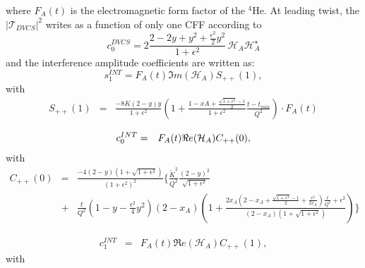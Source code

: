 \normalsize
where $F_A(t)$ is the electromagnetic form factor of the $^4$He. At leading twist, the $|\mathcal{T}_{DVCS}|^{2}$ writes as a function of only one CFF according to
\small
\begin{equation}
   c_0^{DVCS}= 2 \frac{2-2y+y^2 + \frac{\epsilon^2}{2}y^2}{1 + \epsilon^2} \, 
   {\mathcal H}_A {\mathcal H}^{\star}_A 
   \label{eq:c0DVCS}
\end{equation}
\normalsize
and the interference amplitude coefficients are written as:
\small
\begin{equation}
s_{1}^{INT} = F_{A}(t) \Im m(\mathcal{H}_{A}) S_{++}(1),
\end{equation}
with
\begin{eqnarray}
   S_{++}(1) &=& \frac{-8K(2-y)y}{1+\epsilon^2} \left( 1 + 
\frac{1-xA+\frac{\sqrt{1+\epsilon^2}-1}{2}}{1+\epsilon^2} 
\frac{t-t_{min}}{Q^{2}} \right) \cdot F_{A}(t) \label{eq:s1I}
\end{eqnarray}



\begin{eqnarray}
\small
c_0^{INT} &=& F_A(t) \Re e(\mathcal{H}_{A}) C_{++}(0),
\end{eqnarray}
with \begin{eqnarray}  C_{++}(0) &=&
\frac{-4(2-y)(1+\sqrt{1+\epsilon^{2}})}{(1+\epsilon^{2})^2}  \bigg\{ 
   \frac{\widetilde{K}^2}{Q^2}  \frac{(2-y)^2}{\sqrt{1+\epsilon^{2}}} \, \\
   &+& \frac{t}{Q^2}  \left( 1 - y - \frac{\epsilon^2}{4} y^2 \right)  
(2-x_{A}) \left(  1 + \frac{2x_A(2-x_A + \frac{\sqrt{1+\epsilon^{2}}-1}{2} + 
\frac{\epsilon^{2}}{2x_A})\frac{t}{Q^2} + \epsilon^{2}}{(2-x_A) 
(1+\sqrt{1+\epsilon^{2}})}  \right)  \bigg\} \nonumber
 \label{eq:c0I} 
 \end{eqnarray}

\begin{eqnarray}
   c_1^{INT} &=&  F_A(t) \Re e(\mathcal{H}_{A}) C_{++}(1),
\end{eqnarray}
with  
   
